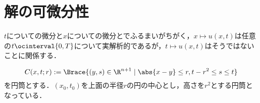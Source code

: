 \documentclass[uplatex,dvipdfmx]{jsreport}
\begin{document}
\section{解の可微分性}

\begin{tcolorbox}[colframe=ForestGreen, colback=ForestGreen!10!white,breakable,colbacktitle=ForestGreen!40!white,coltitle=black,fonttitle=\bfseries\sffamily,
title=]
    $t$についての微分と$x$についての微分とでふるまいがちがく，$x\mapsto u(x,t)$は任意の$t\ocinterval{0,T}$について実解析的であるが，$t\mapsto u(x,t)$はそうではないことに関係する\cite{Evans}．
\end{tcolorbox}

\begin{notation}
    \[C(x,t;r):=\Brace{(y,s)\in\R^{n+1}\mid \abs{x-y}\le r,t-r^2\le s\le t}\]
    を円筒とする．$(x_0,t_0)$を上面の半径$r$の円の中心とし，高さを$r^2$とする円筒となっている．
\end{notation}
\end{document}
